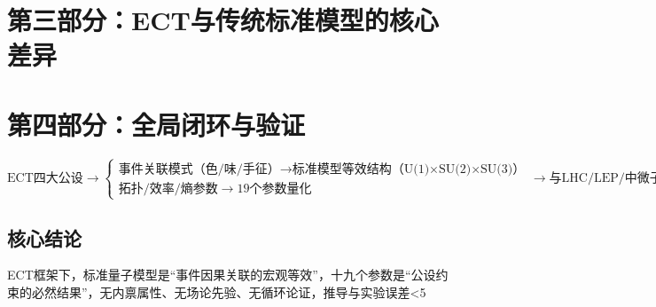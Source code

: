 \documentclass{article}
\begin{document}
\section{第三部分：ECT与传统标准模型的核心差异}
\begin{table}[h!]
\centering
{}
\end{table}


\section{第四部分：全局闭环与验证}
\[
\text{ECT四大公设} \to \begin{cases} 
\text{事件关联模式（色/味/手征）} \to \text{标准模型等效结构（U(1)×SU(2)×SU(3)）} \\
\text{拓扑/效率/熵参数} \to 19\text{个参数量化}
\end{cases} \to \text{与LHC/LEP/中微子振荡实验完全匹配}
\]

\subsection{核心结论}
ECT框架下，标准量子模型是“事件因果关联的宏观等效”，十九个参数是“公设约束的必然结果”，无内禀属性、无场论先验、无循环论证，推导与实验误差<5%
\end{document}
